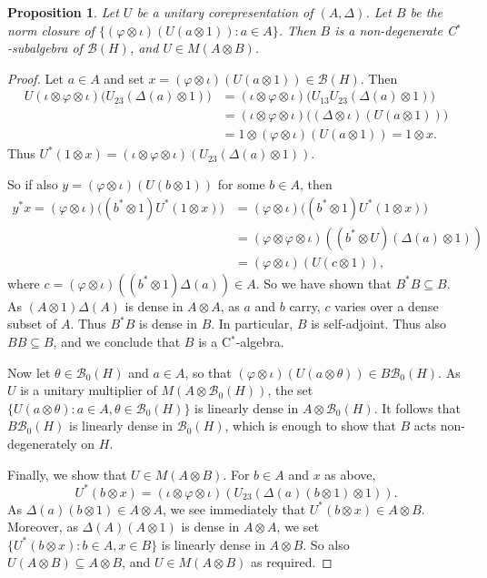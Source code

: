 \documentclass[twoside,a4paper,12pt]{article}
\theoremstyle{plain}
\newtheorem{proposition}{Proposition}[section]
\theoremstyle{definition}
\newcommand{\mc}{\mathcal}
\begin{document}
\begin{proposition}\label{prop:cstar_corep}
Let $U$ be a unitary corepresentation of $(A,\Delta)$.  Let $B$ be the norm closure
of $\{ (\varphi\otimes\iota)(U(a\otimes 1)) : a\in A \}$.  Then $B$ is
a non-degenerate C$^*$-subalgebra of $\mc B(H)$, and $U\in M(A\otimes B)$.
\end{proposition}
\begin{proof}
Let $a\in A$ and set $x = (\varphi\otimes\iota)(U(a\otimes 1)) \in
\mc B(H)$.  Then
\begin{align*}
U(\iota\otimes\varphi\otimes\iota)\big(U_{23}(\Delta(a)\otimes 1)\big)
&= (\iota\otimes\varphi\otimes\iota)
   \big(U_{13}U_{23}(\Delta(a)\otimes 1)\big) \\
&= (\iota\otimes\varphi\otimes\iota)\big((\Delta\otimes\iota)(U(a\otimes 1))
   \big) \\
&= 1 \otimes (\varphi\otimes\iota)(U(a\otimes 1)) = 1\otimes x.
\end{align*}
Thus $U^*(1\otimes x) = (\iota\otimes\varphi\otimes\iota)
(U_{23}(\Delta(a)\otimes 1))$.

So if also $y=(\varphi\otimes\iota)(U(b\otimes 1))$ for some $b\in A$, then
\begin{align*}
y^*x = (\varphi\otimes\iota)\big( (b^*\otimes 1)U^*(1\otimes x) \big)
&= (\varphi\otimes\iota)\big( (b^*\otimes 1)U^*(1\otimes x) \big) \\
&= (\varphi\otimes\varphi\otimes\iota)
((b^*\otimes U)(\Delta(a)\otimes 1)) \\
&= (\varphi\otimes\iota)(U(c\otimes 1)),
\end{align*}
where $c = (\varphi\otimes\iota)( (b^*\otimes 1)\Delta(a) ) \in A$.
So we have shown that $B^* B \subseteq B$.  As $(A\otimes 1)\Delta(A)$ is
dense in $A\otimes A$, as $a$ and $b$ carry, $c$ varies over a dense subset
of $A$.  Thus $B^*B$ is dense in $B$.  In particular, $B$ is self-adjoint.
Thus also $BB\subseteq B$, and we conclude that $B$ is a C$^*$-algebra.

Now let $\theta\in\mc B_0(H)$ and $a\in A$, so that
$(\varphi\otimes\iota)(U(a\otimes \theta)) \in B \mc B_0(H)$.  As $U$ is
a unitary multiplier of $M(A\otimes\mc B_0(H))$, the set
$\{ U(a\otimes \theta) : a\in A, \theta\in\mc B_0(H) \}$ is linearly dense in
$A\otimes \mc B_0(H)$.  It follows that $B \mc B_0(H)$ is linearly dense in
$\mc B_0(H)$, which is enough to show that $B$ acts non-degenerately on $H$.

Finally, we show that $U\in M(A\otimes B)$.  For $b\in A$ and $x$ as above,
\[ U^*(b\otimes x) = (\iota\otimes\varphi\otimes\iota)
(U_{23}(\Delta(a)(b\otimes 1)\otimes 1)). \]
As $\Delta(a)(b\otimes 1)\in A\otimes A$, we see immediately that
$U^*(b\otimes x) \in A\otimes B$.  Moreover, as $\Delta(A)(A\otimes 1)$
is dense in $A\otimes A$, we set $\{ U^*(b\otimes x) : b\in A, x\in B \}$
is linearly dense in $A\otimes B$.  So also $U(A\otimes B) \subseteq
A\otimes B$, and $U\in M(A\otimes B)$ as required.
\end{proof}
\end{document}
